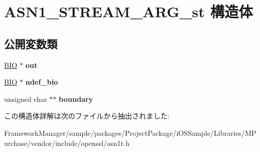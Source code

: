\hypertarget{struct_a_s_n1___s_t_r_e_a_m___a_r_g__st}{}\section{A\+S\+N1\+\_\+\+S\+T\+R\+E\+A\+M\+\_\+\+A\+R\+G\+\_\+st 構造体}
\label{struct_a_s_n1___s_t_r_e_a_m___a_r_g__st}
\subsection*{公開変数類}
\begin{DoxyCompactItemize}
\item 
\hypertarget{struct_a_s_n1___s_t_r_e_a_m___a_r_g__st_ac35c1f4f1baf2ecf2e38d6586fe313d1}{}\hyperlink{structbio__st}{B\+I\+O} $\ast$ {\bfseries out}\label{struct_a_s_n1___s_t_r_e_a_m___a_r_g__st_ac35c1f4f1baf2ecf2e38d6586fe313d1}

\item 
\hypertarget{struct_a_s_n1___s_t_r_e_a_m___a_r_g__st_a3008dd662b50834af241f3f674578e8a}{}\hyperlink{structbio__st}{B\+I\+O} $\ast$ {\bfseries ndef\+\_\+bio}\label{struct_a_s_n1___s_t_r_e_a_m___a_r_g__st_a3008dd662b50834af241f3f674578e8a}

\item 
\hypertarget{struct_a_s_n1___s_t_r_e_a_m___a_r_g__st_af36de93a0bc727a033a9db57238e4161}{}unsigned char $\ast$$\ast$ {\bfseries boundary}\label{struct_a_s_n1___s_t_r_e_a_m___a_r_g__st_af36de93a0bc727a033a9db57238e4161}

\end{DoxyCompactItemize}


この構造体詳解は次のファイルから抽出されました\+:\begin{DoxyCompactItemize}
\item 
Framework\+Manager/sample/packages/\+Project\+Package/i\+O\+S\+Sample/\+Libraries/\+M\+Purchase/vendor/include/openssl/asn1t.\+h\end{DoxyCompactItemize}

